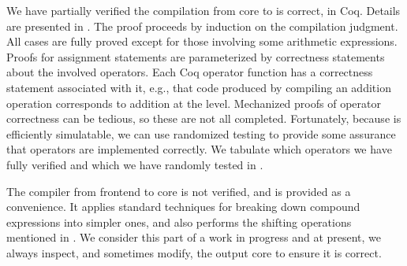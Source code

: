 We have partially verified the compilation from core \vqir to \sqir is
correct, in Coq. Details are presented in
. The proof proceeds by
induction on the compilation judgment. All cases are fully proved
except for those involving some arithmetic expressions. Proofs for
assignment statements are parameterized by correctness statements
about the involved operators.  Each Coq operator function has a
correctness statement associated with it, e.g., that \vqir code
produced by compiling an addition operation corresponds to addition at
the \vqimp level. Mechanized proofs of operator correctness can be
tedious, so these are not all completed. Fortunately, because \vqir is
efficiently simulatable, we can use randomized testing to provide some
assurance that operators are implemented correctly. We tabulate which
operators we have fully verified and which we have randomly tested in
.

The compiler from frontend \vqimp to core \vqimp is not verified, and
is provided as a convenience. It applies standard techniques for
breaking down compound expressions into simpler ones, and also
performs the shifting operations mentioned in
. We consider this part of \qvm a work in
progress and at present, we always inspect, and sometimes modify, the
output core \vqimp to ensure it is correct.

